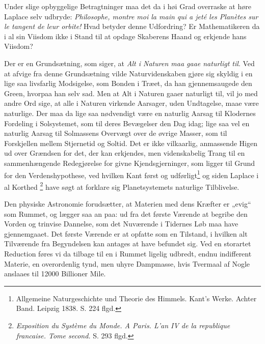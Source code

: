 \documentclass[12pt,a4paper]{book}
\renewcommand{\thefootnote}{*)}
\begin{document}
Under slige opbyggelige Betragtninger maa det da i høi Grad overraske at
høre Laplace selv udbryde: \textit{Philosophe, montre moi la main qui a
jeté les Planètes sur le tangent de leur orbite!} Hvad betyder denne
Udfordring? Er Mathematikeren da i al sin Viisdom ikke i Stand til at
opdage Skaberens Haand og erkjende hans Viisdom?

Der er en Grundsætning, som siger, at \emph{Alt i Naturen maa gaae
naturligt til}. Ved at afvige fra denne Grundsætning vilde
Naturvidenskaben gjøre sig skyldig i en lige saa livsfarlig Modsigelse,
som Bonden i Træet, da han gjennemsaugede den Green, hvorpaa han selv
sad. Men at
Alt i Naturen gaaer naturligt til, vil jo med andre Ord sige, at alle i
Naturen virkende Aarsager, uden Undtagelse, maae være naturlige. Der
maa da lige saa nødvendigt være en naturlig Aarsag til Klodernes
Fordeling i Solsystemet, som til deres Bevægelser den Dag idag; lige saa
vel en naturlig Aarsag til Solmassens Overvægt over de øvrige Masser,
som til Forskjellen mellem Stjernetid og Soltid. Det er ikke vilkaarlig,
anmassende Higen ud over Grændsen for det, der kan erkjendes, men
videnskabelig Trang til en sammenhængende Redegjørelse for givne
Kjendsgjerninger, som ligger til Grund for den Verdenshypothese, ved
hvilken Kant først og udførligt\footnote{%
Allgemeine Naturgeschichte und Theorie des Himmels. Kant's Werke.
Achter Band. Leipzig 1838. S. 224 flgd.}
og siden Laplace i al Korthed%
\renewcommand{\thefootnote}{**)}%
\footnote{%
\textit{Exposition du Système du Monde. A Paris. L'an IV de la
republique francaise. Tome second.} S. 293 flgd.}%
\renewcommand{\thefootnote}{*)}
have søgt at forklare sig Planetsystemets naturlige Tilblivelse.

Den physiske Astronomie forudsætter, at Materien med dens Kræfter er
„evig“ som Rummet, og lægger saa an paa: ud fra det første Værende at
begribe den Vorden og trinvise Dannelse, som det Nuværende i Tidernes
Løb maa have gjennemgaaet. Det første Værende er at opfatte som en
Tilstand, i hvilken alt Tilværende fra Begyndelsen kan antages at have
befundet sig. Ved en storartet Reduction føres vi da tilbage til en i
Rummet ligelig udbredt, endnu indifferent Materie, en overordenlig tynd,
men uhyre Dampmasse, hvis Tvermaal af Nogle anslaaes til 12000 Billioner
Mile.
\end{document}
